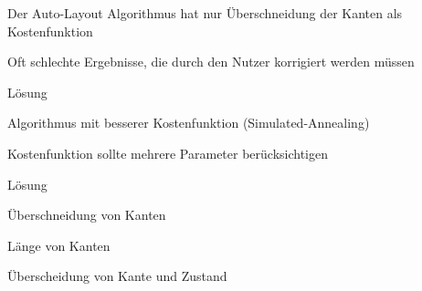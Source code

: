 {
    \begin{itemgroup}{}
	\item Der Auto-Layout Algorithmus hat nur Überschneidung der Kanten als
	Kostenfunktion
	\item Oft schlechte Ergebnisse, die durch den Nutzer korrigiert werden müssen
    \end{itemgroup}

    \begin{itemgroup}{Lösung}
	\item Algorithmus mit besserer Kostenfunktion (Simulated-Annealing)
	\item Kostenfunktion sollte mehrere Parameter berücksichtigen
		\begin{itemgroup}{Lösung}
		\item Überschneidung von Kanten
		\item Länge von Kanten
		\item Überscheidung von Kante und Zustand
		\end{itemgroup}
	\end{itemgroup}
    
    \vfill{}
}


